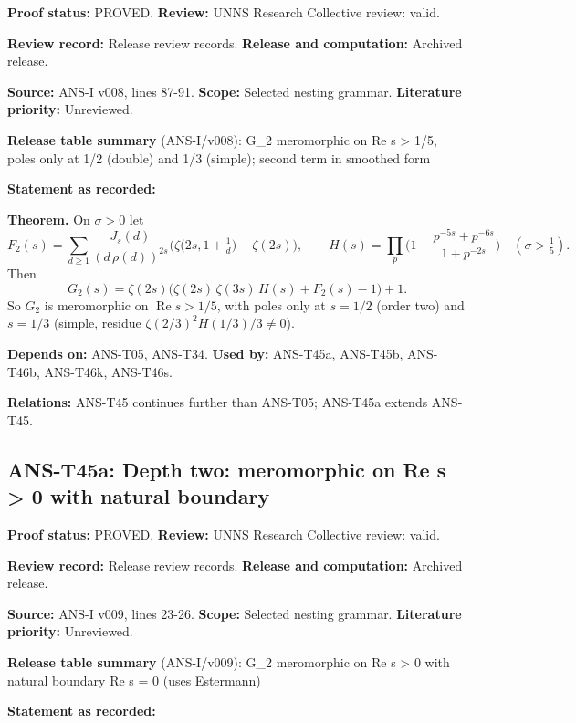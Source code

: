 \documentclass[
  11pt,
]{article}
\begin{document}
\textbf{Proof status:} PROVED. \textbf{Review:} UNNS Research Collective
review: valid.

\textbf{Review record:} Release review records. \textbf{Release and
computation:} Archived release.

\textbf{Source:} ANS-I v008, lines 87-91. \textbf{Scope:} Selected
nesting grammar. \textbf{Literature priority:} Unreviewed.

\textbf{Release table summary} (ANS-I/v008): G\_2 meromorphic on Re s
\textgreater{} 1/5, poles only at 1/2 (double) and 1/3 (simple); second
term in smoothed form

\textbf{Statement as recorded:}

\textbf{Theorem.} On \(\sigma>0\) let
\[F_2(s)=\sum_{d\ge1}\frac{J_s(d)}{(d\,\rho(d))^{2s}}\Big(\zeta\big(2s,1+\tfrac1d\big)-\zeta(2s)\Big),\qquad H(s)=\prod_p\Big(1-\frac{p^{-5s}+p^{-6s}}{1+p^{-2s}}\Big)\quad(\sigma>\tfrac15).\]
Then
\[G_2(s)=\zeta(2s)\Big(\zeta(2s)\,\zeta(3s)\,H(s)+F_2(s)-1\Big)+1.\] So
\(G_2\) is meromorphic on \(\operatorname{Re}s>1/5\), with poles only at
\(s=1/2\) (order two) and \(s=1/3\) (simple, residue
\(\zeta(2/3)^2H(1/3)/3\ne0\)).

\textbf{Depends on:} ANS-T05, ANS-T34. \textbf{Used by:} ANS-T45a,
ANS-T45b, ANS-T46b, ANS-T46k, ANS-T46s.

\textbf{Relations:} ANS-T45 continues further than ANS-T05; ANS-T45a
extends ANS-T45.

\hypertarget{ans-t45a-depth-two-meromorphic-on-re-s-0-with-natural-boundary}{%
\subsection{ANS-T45a: Depth two: meromorphic on Re s \textgreater{} 0
with natural
boundary}\label{ans-t45a-depth-two-meromorphic-on-re-s-0-with-natural-boundary}}

\textbf{Proof status:} PROVED. \textbf{Review:} UNNS Research Collective
review: valid.

\textbf{Review record:} Release review records. \textbf{Release and
computation:} Archived release.

\textbf{Source:} ANS-I v009, lines 23-26. \textbf{Scope:} Selected
nesting grammar. \textbf{Literature priority:} Unreviewed.

\textbf{Release table summary} (ANS-I/v009): G\_2 meromorphic on Re s
\textgreater{} 0 with natural boundary Re s = 0 (uses Estermann)

\textbf{Statement as recorded:}
\end{document}
